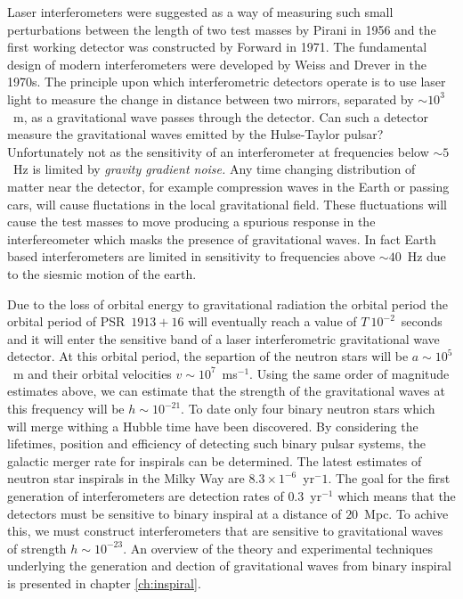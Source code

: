 Laser interferometers were suggested as a way of measuring such small
perturbations between the length of two test masses by Pirani in
1956\cite{Pirani:1956} and the first working detector was constructed by
Forward in 1971\cite{Forward:1971}. The fundamental design of modern
interferometers were developed by Weiss\cite{Weiss:1972} and
Drever\cite{Drever:1980} in the 1970s. The principle upon which
interferometric detectors operate is to use laser light to measure the change
in distance between two mirrors, separated by $\sim 10^{3}$~m, as a
gravitational wave passes through the detector. Can such a detector measure
the gravitational waves emitted by the Hulse-Taylor pulsar? Unfortunately not
as the sensitivity of an interferometer at frequencies below $\sim 5$~Hz is
limited by \emph{gravity gradient noise.} Any time changing distribution of
matter near the detector, for example compression waves in the Earth or
passing cars, will cause fluctations in the local gravitational field. These
fluctuations will cause the test masses to move producing a spurious response
in the interfereometer which masks the presence of gravitational waves. In
fact Earth based interferometers are limited in sensitivity to frequencies
above $\sim 40$~Hz due to the siesmic motion of the earth.

Due to the loss of orbital energy to gravitational radiation the orbital
period the orbital period of PSR~$1913+16$ will eventually reach a value of
$T~10^{-2}$~seconds and it will enter the sensitive band of a laser
interferometric gravitational wave detector. At this orbital period, the
separtion of the neutron stars will be $a \sim 10^5$~m and their orbital velocities
$v \sim 10^7$~ms$^{-1}$. Using the same order of magnitude estimates above, we
can estimate that the strength of the gravitational waves at this frequency
will be $h \sim 10^{-21}$. To date only four binary neutron stars which will
merge withing a Hubble time have been discovered.  By considering the
lifetimes, position and efficiency of detecting such binary pulsar systems,
the galactic merger rate for inspirals can be determined\cite{Phinney:1991}.
The latest estimates of neutron star inspirals in the Milky Way are $8.3
\times 1^{-6}$~yr$^-1$. The goal for the first generation of interferometers
are detection rates of $0.3$~yr$^{-1}$ which means that the detectors must be
sensitive to binary inspiral at a distance of $20$~Mpc. To achive this, we
must construct interferometers that are sensitive to gravitational waves of
strength $h \sim 10^{-23}$. An overview of the theory and experimental
techniques underlying the generation and dection of gravitational waves from
binary inspiral is presented in chapter \ref{ch:inspiral}.

